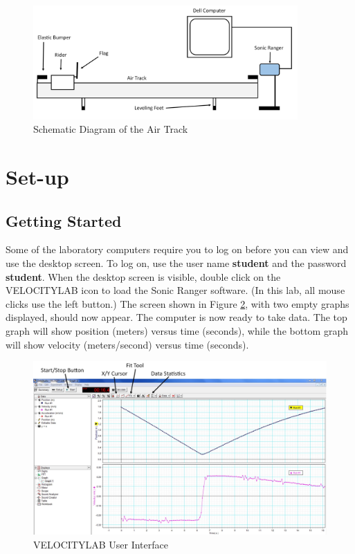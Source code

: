 \begin{figure}[h]
    \begin{center}
        \includegraphics[width=0.9\textwidth]{./Exp1-3/pic/image11.jpg}
    \end{center}
    \caption{Schematic Diagram of the Air Track}
    \label{fig:airtrack}
\end{figure}

\section{Set-up}

\subsection{Getting Started}

Some of the laboratory computers require you to log on before you can view and use the desktop screen.  To log on, use the user name \textbf{student} and the password \textbf{student}.  When the desktop screen is visible, double click on the VELOCITYLAB icon to load the Sonic Ranger software.  (In this lab, all mouse clicks use the left button.)  The screen shown in Figure \ref{fig:velocitylab}, with two empty graphs displayed, should now appear.  The computer is now ready to take data.  The top graph will show position (meters) versus time (seconds), while the bottom graph will show velocity (meters/second) versus time (seconds).
\begin{figure}[h]
    \begin{center}
        \includegraphics[width=1.0\textwidth]{./Exp1-3/pic/image16.jpg}
    \end{center}
    \caption{VELOCITYLAB User Interface}
    \label{fig:velocitylab}
\end{figure}

